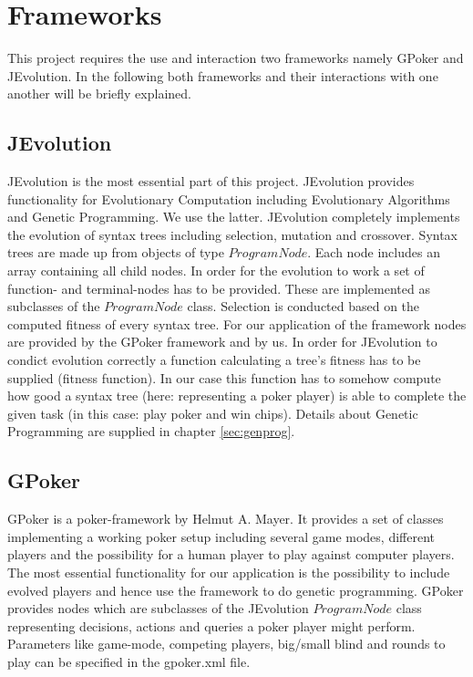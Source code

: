 \section{Frameworks}
This project requires the use and interaction two frameworks namely GPoker and JEvolution. In the following both frameworks and their interactions with one another will be briefly explained.

\subsection{JEvolution}
JEvolution is the most essential part of this project. JEvolution provides functionality for Evolutionary Computation including Evolutionary Algorithms and Genetic Programming.
We use the latter. JEvolution completely implements the evolution of syntax trees including selection, mutation and crossover. Syntax trees are made up from objects of type
$ProgramNode$. Each node includes an array containing all child nodes. In order for the evolution to work a set of function- and terminal-nodes has to be provided. These
are implemented as subclasses of the $ProgramNode$ class. Selection is conducted based on the computed fitness of every syntax tree. For our application of the framework
nodes are provided by the GPoker framework and by us. In order for JEvolution to condict evolution correctly a function calculating a tree's fitness has to be supplied (fitness function). In
our case this function has to somehow compute how good a syntax tree (here: representing a poker player) is able to complete the given task (in this case: play poker and win
chips). Details about Genetic Programming are supplied in chapter \ref{sec:genprog}.

\subsection{GPoker}
GPoker is a poker-framework by Helmut A. Mayer. It provides a set of classes implementing a working poker setup including several game modes, different players and the
possibility for a human player to play against computer players. The most essential functionality for our application is the possibility to include evolved players and hence
use the framework to do genetic programming. GPoker provides nodes which are subclasses of the JEvolution $ProgramNode$ class representing decisions, actions and queries a
poker player might perform. Parameters like game-mode, competing players, big/small blind and rounds to play can be specified in the gpoker.xml file.

